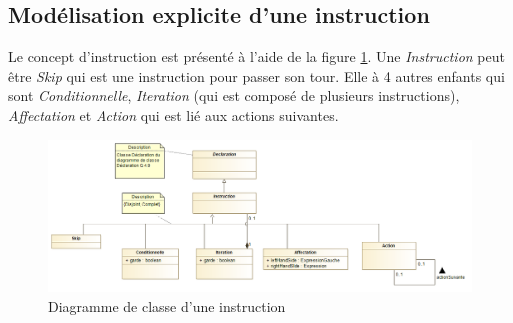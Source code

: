 
\subsection{Modélisation explicite d'une instruction}
\label{sec:question13}

Le concept d'instruction est présenté à l'aide de la figure \ref{fig:instruction}. Une \emph{Instruction} peut être \emph{Skip} qui est une instruction pour passer son tour. Elle à 4 autres enfants qui sont \emph{Conditionnelle}, \emph{Iteration} (qui est composé
de plusieurs instructions), \emph{Affectation} et \emph{Action} qui est lié aux actions suivantes.

\begin{figure}
	\centering
	\includegraphics[width=500pt]{assets/class__Instruction}
	\caption{Diagramme de classe d'une instruction}
	\label{fig:instruction}
\end{figure}